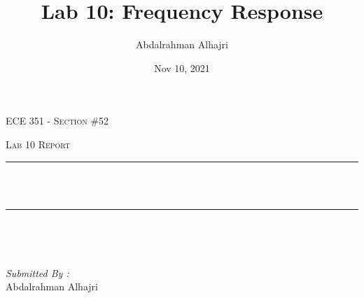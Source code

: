 \documentclass[12pt]{report}
\title{Lab 10: Frequency Response}
\author{Abdalrahman Alhajri}
\date{Nov 10, 2021}
\makeatletter
\let\thetitle\@title
\makeatother
\begin{document}

\begin{titlepage}
	\centering
    \vspace*{0.5 cm}
\begin{center}    \textsc{\Large   ECE 351 - Section \#52 }\\[2.0 cm]	\end{center}%
	\textsc{\Large Lab 10 Report }\\[0.5 cm]				%
	\rule{\linewidth}{0.2 mm} \\[0.4 cm]
	{ \huge \bfseries \thetitle}\\
	\rule{\linewidth}{0.2 mm} \\[1.5 cm]
	
	\begin{minipage}{0.4\textwidth}
		\begin{flushleft} \large
			\end{flushleft}
			\end{minipage}~
			\begin{minipage}{0.4\textwidth}
            
			\begin{flushright} \large
			\emph{Submitted By :} \\
			Abdalrahman Alhajri  
		\end{flushright}
           
	\end{minipage}\\[2 cm]
	
    
    
    
    
	
\end{titlepage}


\tableofcontents
\pagebreak

\renewcommand{\thesection}{\arabic{section}}
\end{document}
